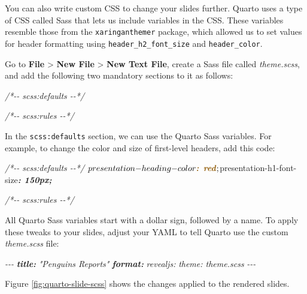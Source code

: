 \documentclass[
]{book}
\newenvironment{Shaded}{\begin{snugshade}}{\end{snugshade}}
\newcommand{\AnnotationTok}[1]{\textcolor[rgb]{0.56,0.35,0.01}{\textbf{\textit{#1}}}}
\newcommand{\CommentTok}[1]{\textcolor[rgb]{0.56,0.35,0.01}{\textit{#1}}}
\newcommand{\InformationTok}[1]{\textcolor[rgb]{0.56,0.35,0.01}{\textbf{\textit{#1}}}}
\newcommand{\NormalTok}[1]{#1}
\begin{document}
You can also write custom CSS to change your slides further. Quarto uses a type of CSS called Sass that lets us include variables in the CSS. These variables resemble those from the \texttt{xaringanthemer} package, which allowed us to set values for header formatting using \texttt{header\_h2\_font\_size} and \texttt{header\_color}.

Go to \textbf{File} \textgreater{} \textbf{New File} \textgreater{} \textbf{New Text File}, create a Sass file called \emph{theme.scss}, and add the following two mandatory sections to it as follows:

\begin{Shaded}
\begin{Highlighting}[]
\CommentTok{/*{-}{-} scss:defaults {-}{-}*/}

\CommentTok{/*{-}{-} scss:rules {-}{-}*/}
\end{Highlighting}
\end{Shaded}

In the \texttt{scss:defaults} section, we can use the Quarto Sass variables. For example, to change the color and size of first-level headers, add this code:

\begin{Shaded}
\begin{Highlighting}[]
\CommentTok{/*{-}{-} scss:defaults {-}{-}*/}
\NormalTok{$presentation{-}heading{-}color}\InformationTok{: red}\NormalTok{;}
\NormalTok{$presentation{-}h1{-}font{-}size}\InformationTok{: 150px;}

\CommentTok{/*{-}{-} scss:rules {-}{-}*/}
\end{Highlighting}
\end{Shaded}

All Quarto Sass variables start with a dollar sign, followed by a name. To apply these tweaks to your slides, adjust your YAML to tell Quarto use the custom \emph{theme.scss} file:

\begin{Shaded}
\begin{Highlighting}[]
\CommentTok{{-}{-}{-}}
\AnnotationTok{title:}\CommentTok{ "Penguins Reports"}
\AnnotationTok{format:}
\CommentTok{  revealjs: }
\CommentTok{    theme: theme.scss}
\CommentTok{{-}{-}{-}}
\end{Highlighting}
\end{Shaded}

Figure \ref{fig:quarto-slide-scss} shows the changes applied to the rendered slides.
\end{document}
